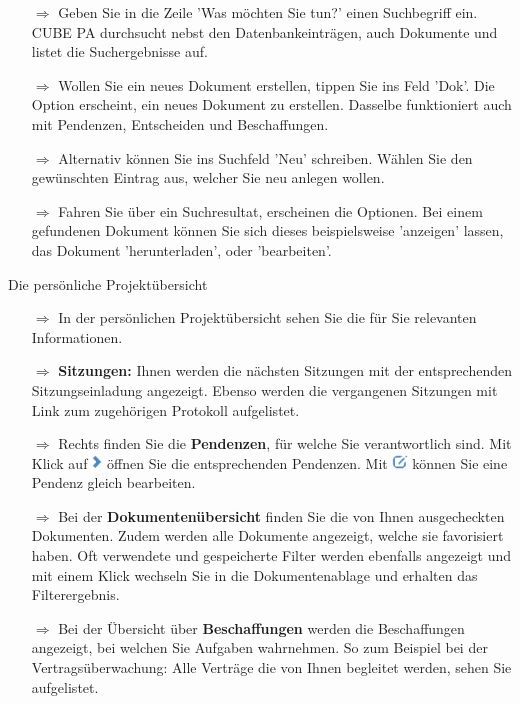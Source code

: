 \documentclass{article}
\begin{document}
\begin{multicols}{2}
\begin{tcolorbox}[colback=blue!5,colframe=blue!40!black,title=Was möchten Sie tun?]
\begin{itemize}
  \item[$\Longrightarrow$] Geben Sie in die Zeile 'Was möchten Sie tun?' einen Suchbegriff ein. CUBE PA durchsucht nebst den Datenbankeinträgen, auch Dokumente und listet die Suchergebnisse auf.
  \item[$\Longrightarrow$] Wollen Sie ein neues Dokument erstellen, tippen Sie ins Feld 'Dok'. Die Option erscheint, ein neues Dokument zu erstellen.  Dasselbe funktioniert auch mit Pendenzen, Entscheiden und Beschaffungen.
	\item[$\Longrightarrow$] Alternativ können Sie ins Suchfeld 'Neu' schreiben. Wählen Sie den gewünschten Eintrag aus, welcher Sie neu anlegen wollen.
	\item[$\Longrightarrow$] Fahren Sie über ein Suchresultat, erscheinen die Optionen. Bei einem gefundenen Dokument können Sie sich dieses beispielsweise 'anzeigen' lassen, das Dokument 'herunterladen', oder 'bearbeiten'. 
\end{itemize}
\end{tcolorbox}


\end{multicols}

\begin{beamerlikethm}{Die persönliche Projektübersicht}
\begin{itemize}
 \item[$\Longrightarrow$] In der persönlichen Projektübersicht sehen Sie die für Sie relevanten Informationen.
 \item[$\Longrightarrow$] \textbf{Sitzungen:} Ihnen werden die nächsten Sitzungen mit der entsprechenden Sitzungseinladung angezeigt. Ebenso werden die vergangenen Sitzungen mit Link zum zugehörigen Protokoll aufgelistet.
 \item[$\Longrightarrow$] Rechts finden Sie die \textbf{Pendenzen}, für welche Sie verantwortlich sind. Mit Klick auf \includegraphics[height=10pt]{Icons/Pfeil_rechts.png} öffnen Sie die entsprechenden Pendenzen. Mit \includegraphics[height=10pt]{Icons/bearbeiten.png} können Sie eine Pendenz gleich bearbeiten.
 \item[$\Longrightarrow$] Bei der \textbf{Dokumentenübersicht} finden Sie die von Ihnen ausgecheckten Dokumenten. Zudem werden alle Dokumente angezeigt, welche sie favorisiert haben. Oft verwendete und gespeicherte Filter werden ebenfalls angezeigt und mit einem Klick wechseln Sie in die Dokumentenablage und erhalten das Filterergebnis.
 \item[$\Longrightarrow$] Bei der Übersicht über \textbf{Beschaffungen} werden die Beschaffungen angezeigt, bei welchen Sie Aufgaben wahrnehmen. So zum Beispiel bei der Vertragsüberwachung: Alle Verträge die von Ihnen begleitet werden, sehen Sie aufgelistet.
\end{itemize}
\end{beamerlikethm}
\end{document}
